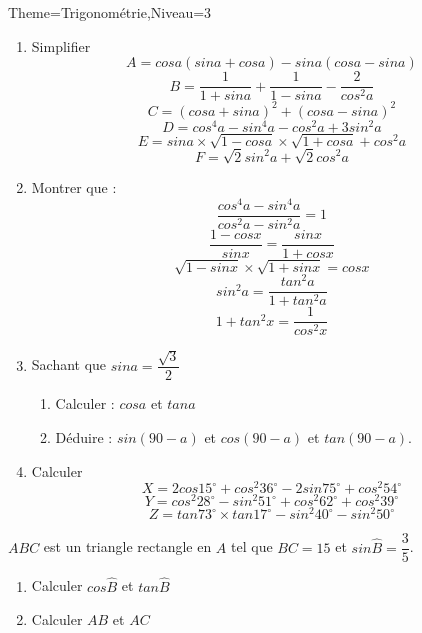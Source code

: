 \documentclass[a4paper,12pt]{article}
\begin{document}
\begin{Maquette}[Fiche]{Theme=Trigonométrie,Niveau=3}
\begin{exercice}
\setlength{\columnseprule}{0.5pt}
\begin{multicols}{2}
\begin{enumerate}
\item Simplifier
$$A=cos a(sin a + cos a )-sin a(cos a -sin a) $$
$$B=\dfrac{1}{1+sin a}+\dfrac{1}{1-sin a}-\dfrac{2}{cos^{2}a} $$
$$C=(cosa + sina)^{2}+(cosa-sina)^{2} $$
$$D=cos^{4}a-sin^{4}a-cos^{2}a+3sin^{2}a$$
$$E=sina\times \sqrt{1-cosa}\times \sqrt{1+cosa}+cos^{2}a$$
$$F=\sqrt{2}sin^{2}a+\sqrt{2}cos^{2}a$$
\item Montrer que :
$$\dfrac{cos^{4}a-sin^{4}a}{cos^{2}a-sin^{2}a}=1$$
$$\dfrac{1-cosx}{sinx}=\dfrac{sinx}{1+cosx}$$
$$\sqrt{1-sinx}\times\sqrt{1+sinx}=cosx$$
$$sin^{2}a=\dfrac{tan^{2}a}{1+tan^{2}a}$$
$$1+tan^{2}x=\dfrac{1}{cos^{2}x}$$
\item Sachant que $sina=\dfrac{\sqrt{3}}{2}$
\begin{enumerate}
\item Calculer : $cosa$ et $tana$
\item Déduire : $sin(90-a)$ et $cos(90-a)$ et $tan(90-a)$.
\end{enumerate}
\item Calculer 
$$ X= 2cos15^{\circ}+cos^{2}36^{\circ}-2sin75^{\circ}+cos^{2}54^{\circ}$$
$$ Y=cos^{2}28^{\circ}-sin^{2}51^{\circ}+cos^{2}62^{\circ}+cos^{2}39^{\circ}$$
$$ Z=tan73^{\circ}\times tan17^{\circ}-sin^{2}40^{\circ}-sin^{2}50^{\circ}$$
\end{enumerate}
\end{multicols}

\end{exercice}

\begin{exercice}
$ABC$ est un triangle rectangle en $A$ tel que $BC=15$ et $sin\widehat{B}=\dfrac{3}{5}$.
\begin{enumerate}
\item Calculer $cos\widehat{B}$ et $tan\widehat{B}$
\item Calculer $AB$ et $AC$
\end{enumerate}


\end{exercice}














\end{Maquette}
\end{document}
